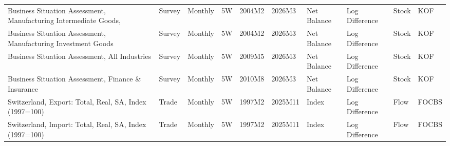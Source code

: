 \begin{table}[ht]
\begin{tabular}{llllllllll}
  Business Situation Assessment, Manufacturing Intermediate Goods,  & Survey & Monthly & 5W & 2004M2 & 2026M3 & Net Balance & Log Difference & Stock & KOF  \\ 
  Business Situation Assessment, Manufacturing Investment Goods  & Survey & Monthly & 5W & 2004M2 & 2026M3 & Net Balance & Log Difference & Stock & KOF  \\ 
  Business Situation Assessment, All Industries & Survey & Monthly & 5W & 2009M5 & 2026M3 & Net Balance & Log Difference & Stock & KOF  \\ 
  Business Situation Assessment, Finance \& Insurance & Survey & Monthly & 5W & 2010M8 & 2026M3 & Net Balance & Log Difference & Stock & KOF  \\ 
  Switzerland, Export: Total, Real, SA, Index (1997=100) & Trade & Monthly & 5W & 1997M2 & 2025M11 & Index & Log Difference & Flow & FOCBS \\ 
  Switzerland, Import: Total, Real, SA, Index (1997=100) & Trade & Monthly & 5W & 1997M2 & 2025M11 & Index & Log Difference & Flow & FOCBS \\ 
   \hline
\end{tabular}
\end{table}
